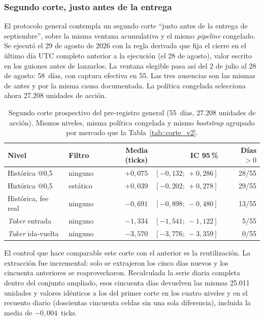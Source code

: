 \subsubsection{Segundo corte, justo antes de la entrega}

El protocolo general contempla un segundo corte ``justo antes de la entrega de
septiembre'', sobre la misma ventana acumulativa y el mismo \emph{pipeline} congelado. Se
ejecutó el 29 de agosto de 2026 con la regla derivada que fija el cierre en el último día
UTC completo anterior a la ejecución (el 28 de agosto), valor escrito en los guiones antes
de lanzarlos. La ventana elegible pasa así del 2 de julio al 28 de agosto: 58~días, con
captura efectiva en 55. Las tres ausencias son las mismas de antes y por la misma causa
documentada. La política congelada selecciona ahora 27.208 unidades de acción.

\begin{table}[htbp]
\centering
\caption[Segundo corte prospectivo del pre-registro general]{Segundo corte prospectivo del
pre-registro general (55~días, 27.208 unidades de acción). Mismos niveles, misma política
congelada y mismo \emph{bootstrap} agrupado por mercado que la Tabla~\ref{tab::corte_v2}.}
\label{tab::corte_v2_n2}
\begin{tabular}{llrrr}
\toprule
\textbf{Nivel} & \textbf{Filtro} & \textbf{Media (ticks)} & \textbf{IC 95\,\%} & \textbf{Días $>0$} \\
\midrule
Histórica @0,5      & ninguno  & $+0{,}075$ & $[-0{,}132;\ +0{,}286]$ & 28/55 \\
Histórica @0,5      & estático & $+0{,}039$ & $[-0{,}202;\ +0{,}278]$ & 29/55 \\
\addlinespace
Histórica, fee real & ninguno  & $-0{,}691$ & $[-0{,}898;\ -0{,}480]$ & 13/55 \\
\emph{Taker} entrada & ninguno & $-1{,}334$ & $[-1{,}541;\ -1{,}122]$ & 5/55 \\
\emph{Taker} ida-vuelta & ninguno & $-3{,}570$ & $[-3{,}776;\ -3{,}359]$ & 0/55 \\
\bottomrule
\end{tabular}
\end{table}

El control que hace comparable este corte con el anterior es la reutilización. La
extracción fue incremental: solo se extrajeron los cinco días nuevos y los cincuenta
anteriores se reaprovecharon. Recalculada la serie diaria completa dentro del conjunto
ampliado, esos cincuenta días devuelven las mismas 25.011 unidades y valores idénticos a
los del primer corte en los cuatro niveles y en el recuento diario (doscientas cincuenta
celdas sin una sola diferencia), incluida la media de $-0{,}004$~ticks.

